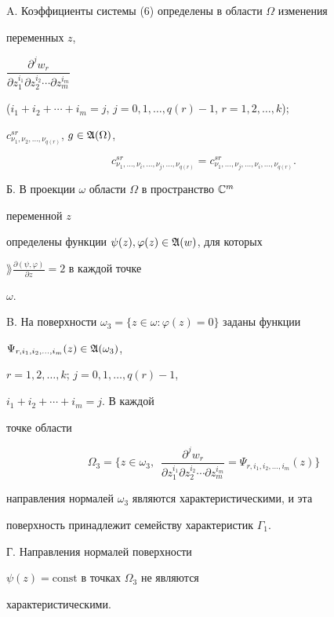 \begin{conjec}


A. Коэффициенты системы (6) определены в области $\Omega$ изменения


переменных $z$,


$\dfrac{\partial^j w_r}{\partial z^{i_1}_1\partial z^{i_2}_2


\dotsb\partial z^{i_m}_m}$


($i_1+i_2+\dotsb+i_m=j$, $j=0,1,\dotsc,q(r)-1$, $r=1,2,\dotsc,k$);


$c^{sr}_{\nu_1,\nu_2,\dotsc,\nu_{q(r)}}$, $g\in\frak A(\Omega)$,


$$


c^{sr}_{\nu_1,\dotsc,\nu_i,\dotsc,\nu_j,\dotsc,\nu_{q(r)}}=


c^{sr}_{\nu_1,\dotsc,\nu_j,\dotsc,\nu_i,\dotsc,\nu_{q(r)}}.


$$





Б. В проекции $\omega$ области $\Omega$ в пространство $\Bbb C^m$


переменной $z$


определены функции $\psi(z),\varphi(z)\in\frak A(w)$, для которых


$\rang\frac{\partial(\psi,\varphi)}{\partial z}=2$ в каждой точке


$\omega$.





B. На поверхности $\omega_3=\{z\in\omega:\varphi(z)=0\}$ заданы функции


$\Psi_{r,i_1,i_2,\dotsc,i_m}(z)\in\frak A(\omega_3)$,


$r=1,2,\dotsc,k$; $j=0,1,\dotsc,q(r)-1$,


$i_1+i_2+\dotsb+i_m=j$. В каждой


точке области


$$


\Omega_3=\biggl\{z\in\omega_3,\ \;


\frac{\partial^j w_r}{\partial z^{i_1}_1\partial z^{i_2}_2


\dotsb\partial z^{i_m}_m}=


\Psi_{r,i_1,i_2,\dotsc,i_m}(z)\biggr\}


$$


направления нормалей $\omega_3$ являются характеристическими, и эта


поверхность принадлежит семейству характеристик $\Gamma_1$.





Г. Направления нормалей поверхности


$\psi(z)=\text{const}$ в точках $\Omega_3$ не являются


характеристическими.


\end{conjec}






